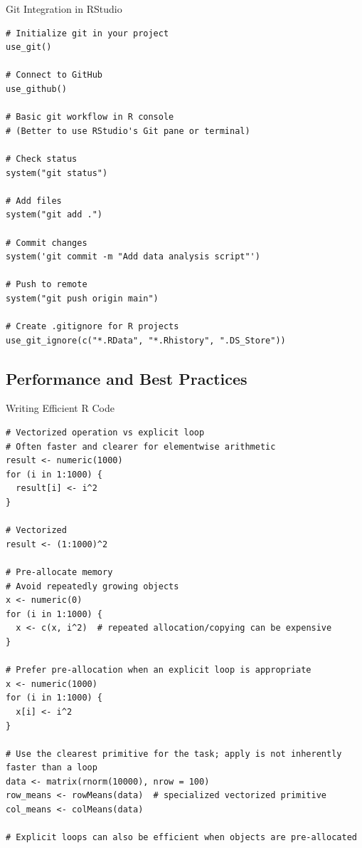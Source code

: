 \documentclass[aspectratio=169]{beamer}
\begin{document}
\begin{frame}[fragile]{Git Integration in RStudio}
\begin{lstlisting}
# Initialize git in your project
use_git()

# Connect to GitHub
use_github()

# Basic git workflow in R console
# (Better to use RStudio's Git pane or terminal)

# Check status
system("git status")

# Add files
system("git add .")

# Commit changes
system('git commit -m "Add data analysis script"')

# Push to remote
system("git push origin main")

# Create .gitignore for R projects
use_git_ignore(c("*.RData", "*.Rhistory", ".DS_Store"))
\end{lstlisting}
\end{frame}

\subsection{Performance and Best Practices}

\begin{frame}[fragile]{Writing Efficient R Code}
\begin{lstlisting}
# Vectorized operation vs explicit loop
# Often faster and clearer for elementwise arithmetic
result <- numeric(1000)
for (i in 1:1000) {
  result[i] <- i^2
}

# Vectorized
result <- (1:1000)^2

# Pre-allocate memory
# Avoid repeatedly growing objects
x <- numeric(0)
for (i in 1:1000) {
  x <- c(x, i^2)  # repeated allocation/copying can be expensive
}

# Prefer pre-allocation when an explicit loop is appropriate
x <- numeric(1000)
for (i in 1:1000) {
  x[i] <- i^2
}

# Use the clearest primitive for the task; apply is not inherently faster than a loop
data <- matrix(rnorm(10000), nrow = 100)
row_means <- rowMeans(data)  # specialized vectorized primitive
col_means <- colMeans(data)

# Explicit loops can also be efficient when objects are pre-allocated
\end{lstlisting}
\end{frame}
\end{document}
